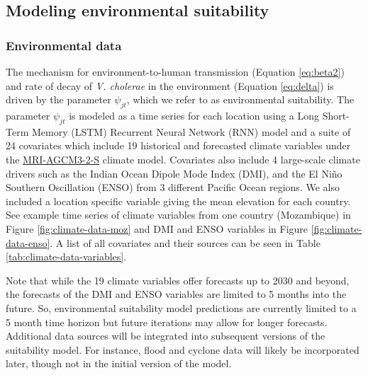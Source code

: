 \documentclass[
]{book}
\begin{document}
\subsection{Modeling environmental suitability}\label{modeling-environmental-suitability}

\subsubsection{Environmental data}\label{environmental-data}

The mechanism for environment-to-human transmission (Equation \eqref{eq:beta2}) and rate of decay of \emph{V. cholerae} in the environment (Equation \eqref{eq:delta}) is driven by the parameter \(\psi_{jt}\), which we refer to as environmental suitability. The parameter \(\psi_{jt}\) is modeled as a time series for each location using a Long Short-Term Memory (LSTM) Recurrent Neural Network (RNN) model and a suite of 24 covariates which include 19 historical and forecasted climate variables under the \href{https://www.wdc-climate.de/ui/cmip6?input=CMIP6.HighResMIP.MRI.MRI-AGCM3-2-S.highresSST-present}{MRI-AGCM3-2-S} climate model. Covariates also include 4 large-scale climate drivers such as the Indian Ocean Dipole Mode Index (DMI), and the El Niño Southern Oscillation (ENSO) from 3 different Pacific Ocean regions. We also included a location specific variable giving the mean elevation for each country. See example time series of climate variables from one country (Mozambique) in Figure \ref{fig:climate-data-moz} and DMI and ENSO variables in Figure \ref{fig:climate-data-enso}. A list of all covariates and their sources can be seen in Table \ref{tab:climate-data-variables}.

Note that while the 19 climate variables offer forecasts up to 2030 and beyond, the forecasts of the DMI and ENSO variables are limited to 5 months into the future. So, environmental suitability model predictions are currently limited to a 5 month time horizon but future iterations may allow for longer forecasts. Additional data sources will be integrated into subsequent versions of the suitability model. For instance, flood and cyclone data will likely be incorporated later, though not in the initial version of the model.
\end{document}
